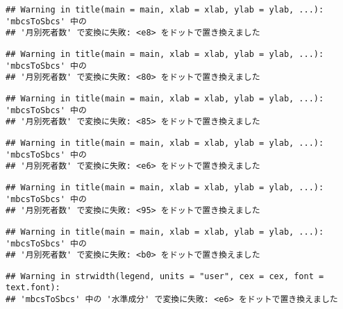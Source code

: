 \documentclass[]{article}
\newenvironment{Shaded}{\begin{snugshade}}{\end{snugshade}}
\newcommand{\AttributeTok}[1]{\textcolor[rgb]{0.77,0.63,0.00}{#1}}
\newcommand{\CommentTok}[1]{\textcolor[rgb]{0.56,0.35,0.01}{\textit{#1}}}
\newcommand{\DecValTok}[1]{\textcolor[rgb]{0.00,0.00,0.81}{#1}}
\newcommand{\FloatTok}[1]{\textcolor[rgb]{0.00,0.00,0.81}{#1}}
\newcommand{\FunctionTok}[1]{\textcolor[rgb]{0.00,0.00,0.00}{#1}}
\newcommand{\NormalTok}[1]{#1}
\newcommand{\SpecialCharTok}[1]{\textcolor[rgb]{0.00,0.00,0.00}{#1}}
\newcommand{\StringTok}[1]{\textcolor[rgb]{0.31,0.60,0.02}{#1}}
\begin{document}
\begin{verbatim}
## Warning in title(main = main, xlab = xlab, ylab = ylab, ...): 'mbcsToSbcs' 中の
## '月別死者数' で変換に失敗: <e8> をドットで置き換えました
\end{verbatim}

\begin{verbatim}
## Warning in title(main = main, xlab = xlab, ylab = ylab, ...): 'mbcsToSbcs' 中の
## '月別死者数' で変換に失敗: <80> をドットで置き換えました
\end{verbatim}

\begin{verbatim}
## Warning in title(main = main, xlab = xlab, ylab = ylab, ...): 'mbcsToSbcs' 中の
## '月別死者数' で変換に失敗: <85> をドットで置き換えました
\end{verbatim}

\begin{verbatim}
## Warning in title(main = main, xlab = xlab, ylab = ylab, ...): 'mbcsToSbcs' 中の
## '月別死者数' で変換に失敗: <e6> をドットで置き換えました
\end{verbatim}

\begin{verbatim}
## Warning in title(main = main, xlab = xlab, ylab = ylab, ...): 'mbcsToSbcs' 中の
## '月別死者数' で変換に失敗: <95> をドットで置き換えました
\end{verbatim}

\begin{verbatim}
## Warning in title(main = main, xlab = xlab, ylab = ylab, ...): 'mbcsToSbcs' 中の
## '月別死者数' で変換に失敗: <b0> をドットで置き換えました
\end{verbatim}

\begin{Shaded}
\end{Shaded}

\begin{verbatim}
## Warning in strwidth(legend, units = "user", cex = cex, font = text.font):
## 'mbcsToSbcs' 中の '水準成分' で変換に失敗: <e6> をドットで置き換えました
\end{verbatim}
\end{document}
